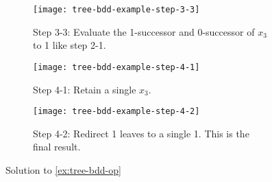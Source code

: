 \documentclass[../src/handouts/main.tex]{subfiles}
\begin{document}
\begin{figure}[htbp]
  \begin{subfigure}[t]{.3\textwidth}
    \centering
    \texttt{[image: tree-bdd-example-step-3-3]}
    \caption{Step 3-3: Evaluate the 1-successor and 0-successor of $x_3$ to 1 like step 2-1.}
    \label{fig:tree-bdd-op-example-step-3-3}
  \end{subfigure}
  \hspace{.025\textwidth}
  \begin{subfigure}[t]{.3\textwidth}
    \centering
    \texttt{[image: tree-bdd-example-step-4-1]}
    \caption{Step 4-1: Retain a single $x_3$.}
    \label{fig:tree-bdd-op-example-step-4-1}
  \end{subfigure}
  \hspace{.025\textwidth}
  \begin{subfigure}[t]{.3\textwidth}
    \centering
    \texttt{[image: tree-bdd-example-step-4-2]}
    \caption{Step 4-2: Redirect 1 leaves to a single 1. This is the final result.}
    \label{fig:tree-bdd-op-example-step-4-2}
  \end{subfigure}

  \caption{Solution to \cref{ex:tree-bdd-op}}
  \label{fig:tree-bdd-op-example}
\end{figure}
\end{document}
